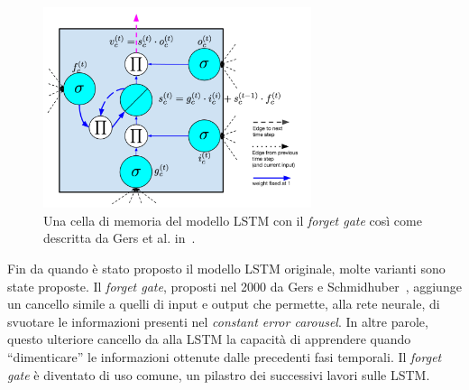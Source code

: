 \begin{figure}[tp]
  \centering
  \begin{center}
    \includegraphics[width=0.7\textwidth]{./images/memoryCellWithForgetGate.png}
  \end{center}
  \caption{Una cella di memoria del modello LSTM con il \emph{forget gate} cos\`i
  come descritta da Gers et al. in~\cite{Gers:2000}.}
  \label{fig:memoryCellWithForgetGate}
\end{figure}

Fin da quando \`e stato proposto il modello LSTM originale, molte varianti sono
state proposte. Il \emph{forget gate}, proposti nel 2000 da Gers e Schmidhuber~\cite{Gers:2000},
aggiunge un cancello simile a quelli di input e output che permette, alla rete
neurale, di svuotare le informazioni presenti nel \emph{constant error carousel}.
In altre parole, questo ulteriore cancello da alla LSTM la capacit\`a di apprendere
quando ``dimenticare'' le informazioni ottenute dalle precedenti fasi temporali.
Il \emph{forget gate} \`e diventato di uso comune, un pilastro dei successivi
lavori sulle LSTM.

